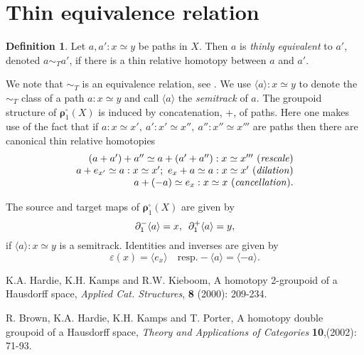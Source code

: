 \documentclass[12pt]{article}
\theoremstyle{plain}
\theoremstyle{definition}
\newtheorem{definition}{Definition}[section]
\numberwithin{equation}{section}
\begin{document}
\section{Thin equivalence relation}
\begin{definition}


Let $ a,a' : x \simeq y $ be paths in $ X $. Then
$ a$ is \emph{thinly equivalent} to $ a' $, denoted $ a \sim_{T} a' $, if
there is a thin relative homotopy between $ a $ and $ a' $.
\end{definition}

We note that $ \sim_{T} $ is an equivalence relation, see
\cite{BHKP}. We use $ \langle a \rangle : x \simeq y $ to denote
the $ \sim_{T} $ class of a path $ a: x \simeq y $ and call $
\langle a \rangle $  the {\it semitrack} of $ a $. The groupoid
structure of $ \boldsymbol{\rho}^\square_1 (X) $ is induced by concatenation,
+, of paths. Here one makes use of the fact that if $ a: x \simeq
x', \ a' : x' \simeq x'', \ a'' : x'' \simeq x''' $ are paths then
there are canonical thin relative homotopies
\[
\begin{array}{r}
(a+a') + a'' \simeq a+ (a' +a'') : x \simeq x''' \ ({\it rescale}) \\
a+e_{x'} \simeq a:x \simeq x' ; \ e_{x} + a \simeq a: x \simeq x' \
({\it dilation}) \\
a+(-a) \simeq e_{x} : x \simeq x \ ({\it cancellation}).
\end{array}
\]

The source and target maps of  $\boldsymbol{\rho}^\square_1 (X)$ are given by
$$\partial^{-}_{1} \langle a\rangle =x,\enskip \partial^{+}_{1}
\langle a\rangle =y,$$
if $\langle a\rangle :x\simeq y$ is a semitrack. Identities and inverses
are given by
$$\varepsilon (x)=\langle e_x\rangle  \quad \mathrm{ resp.} -\langle a\rangle
=\langle -a \rangle.$$

\begin{thebibliography}{9}

K.A. Hardie, K.H. Kamps and R.W. Kieboom, A homotopy 2-groupoid of a Hausdorff space,
\emph{Applied Cat. Structures}, \textbf{8} (2000): 209-234.

R. Brown, K.A. Hardie, K.H. Kamps  and T. Porter, A homotopy double groupoid of a Hausdorff 
space, {\it Theory and Applications of Categories} \textbf{10},(2002): 71-93.

\end{thebibliography}
\end{document}
